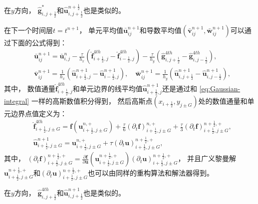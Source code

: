 在$y$方向，
$\hat{\bm{g}}_{i, j+\frac 12}^*$和$\hat {\bm{u}}_{i, j+\frac 12}^{n+\frac 12}$也是类似的。

在下一个时间层$t=t^{n+1}$，
单元平均值$\bar{\bm{u}}_{ij}^{n+1}$和导数平均值$(\bar{\bm{v}}_{ij}^{n+1},\bar{\bm{w}}_{ij}^{n+1})$可以通过下面的公式得到：
\begin{equation}
  \begin{aligned}
     & \bar{\bm{u}}_{ij}^{n+1}=\bar{\bm{u}}_{i, j}^{n}-\frac{\tau}{ h_x} \left(\hat{\bm{f}}_{i+\frac 12, j}^{4th}-\hat{\bm{f}}_{i-\frac 12, j}^{4th}\right) -\frac{\tau}{h_y} \left(\hat{\bm{g}}_{i, j+\frac 12}^{4th}-\hat{\bm{g}}_{i, j-\frac 12}^{4th}\right), \\
     & \bar{\bm{v}}_{ij}^{n+1}=\frac{1}{h_x} \left(\hat {\bm{u}}_{i+\frac 12, j}^{n+1}-\hat {\bm{u}}_{i-\frac 12, j}^{n+1}\right), \quad
    \bar{\bm{w}}_{ij}^{n+1}=\frac{1}{h_y} \left(\hat {\bm{u}}_{i, j+\frac 12}^{n+1}-\hat {\bm{u}}_{i, j-\frac 12}^{n+1}\right),
  \end{aligned}
\end{equation}
其中，
数值通量$\hat{\bm{f}}_{i+\frac 12, j}^{4th}$和单元边界的线平均值$\hat {\bm{u}}_{i+\frac 12, j}^{n+1}$还是通过和 \cref{eq:Gaussian-integral} 一样的高斯数值积分得到，
然后高斯点$(x_{i+\frac{1}{2}},y_{j \pm G})$处的数值通量和单元边界点值定义为：
\begin{align}
   & \hat{\bm{f}}^{4th}_{i+\frac{1}{2},j \pm G}={\bm{f}} \left({\bm{u}}_{i+\frac{1}{2},j \pm G}^{n, +}\right) +\frac{\tau}{6} \left({\partial_{t}}{\bm{f}}\right)_{i+\frac{1}{2},j \pm G}^{n, +}+\frac{\tau}{3} \left({\partial_{t}}{\bm{f}}\right)_{i+\frac{1}{2},j \pm G}^{n+\frac12, +}, \\
   & \hat {\bm{u}}_{i+\frac{1}{2},j \pm G}^{n+1}={\bm{u}}_{i+\frac{1}{2},j \pm G}^{n, +}+\tau \left({\partial_{t}}{\bm{u}}\right)_{i+\frac{1}{2},j \pm G}^{n+\frac{1}{2}, +},
\end{align}
其中，
$\left({\partial_{t}}{\bm{f}}\right)_{i+\frac{1}{2},j \pm G}^{n+\frac{1}{2}, +} = \frac{\partial{\bm{f}}}{\partial{\bm{u}}}\left({\bm{u}}_{i+\frac{1}{2},j \pm G}^{n+\frac{1}{2}, +}\right) \left({\partial_{t}}{\bm{u}}\right)_{i+\frac{1}{2},j \pm G}^{n+\frac{1}{2}, +}$，
并且广义黎曼解${\bm{u}}_{i+\frac{1}{2},j \pm G}^{n+\frac{1}{2}, +}$和$\left({\partial_{t}}{\bm{u}}\right)_{i+\frac{1}{2},j \pm G}^{n+\frac{1}{2}, +}$也可以由同样的重构算法和解法器得到。

在$y$方向，
$\hat{\bm{g}}_{i, j+\frac 12}^{4th}$和$\hat {\bm{u}}_{i, j+\frac 12}^{n+1}$也是类似的。
\vspace{0.3\baselineskip} %


